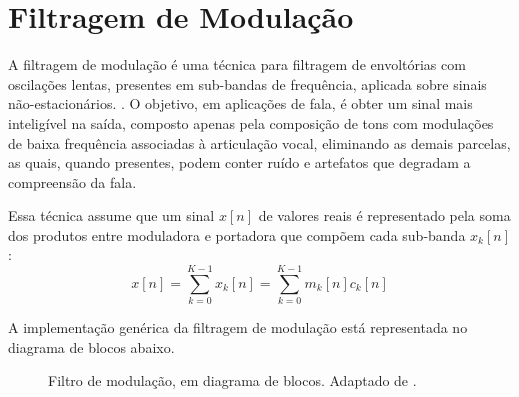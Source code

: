 \section{Filtragem de Modulação} \label{section_fil_mod} A filtragem de
modulação é uma técnica para filtragem de envoltórias com oscilações lentas,
presentes em sub-bandas de frequência, aplicada sobre sinais
não-estacionários.\cite{clark2009sum} \cite{li2005properties}. O objetivo, em
aplicações de fala, é obter um sinal mais inteligível na saída, composto apenas
pela composição de tons com modulações de baixa frequência associadas à
articulação vocal, eliminando as demais parcelas, as quais, quando presentes,
podem conter ruído e artefatos que degradam a compreensão da fala.

Essa técnica assume que um sinal $x[n]$ de valores reais é
representado pela soma dos produtos entre moduladora e portadora que compõem
cada sub-banda $x_k[n]$:
\begin{equation}
    x[n] = \sum_{k = 0}^{K - 1} x_k[n] = \sum_{k = 0}^{K - 1} m_k[n] c_k[n]
\end{equation}

A implementação genérica da filtragem de modulação está representada no diagrama
de blocos abaixo.

\begin{figure}[h]
    \centering
    \caption{Filtro de modulação, em diagrama de blocos. Adaptado de \cite{li2005properties}.}
\end{figure}

